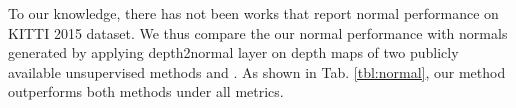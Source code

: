 To our knowledge, there has not been works that report normal performance on KITTI 2015 dataset. We thus compare the our normal performance with normals generated by applying depth2normal layer on depth maps of two publicly available unsupervised methods \cite{zhou2017unsupervised} and \cite{godard2016unsupervised}. As shown in Tab. \ref{tbl:normal}, our method outperforms both methods under all metrics.

